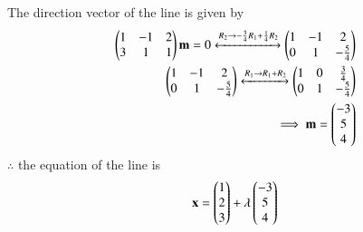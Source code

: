 The direction vector of the line  is given by 
\begin{align*}
 \begin{pmatrix}1&-1&2 \\ 3&1&1\end{pmatrix}\mathbf{m} = 0
 \xleftrightarrow[]{R_2\rightarrow -\frac{3}{4}{R_1} + \frac{1}{4}{R_2}} \begin{pmatrix}1&-1&2 \\ 0&1&-\frac{5}{4}\end{pmatrix}\\
   \begin{pmatrix}1&-1&2 \\ 0&1&-\frac{5}{4}\end{pmatrix} \xleftrightarrow[]{R_1\rightarrow {R_1} + {R_2}} \begin{pmatrix}1&0&\frac{3}{4} \\ 0&1&-\frac{5}{4}\end{pmatrix}
   \\
 \implies \mathbf{m} =\begin{pmatrix}-3\\5\\4\end{pmatrix}
\end{align*}
$\therefore$ the equation of the line is
\begin{align}
    \mathbf{x} = \begin{pmatrix}1\\2\\3\end{pmatrix} + \lambda\begin{pmatrix}-3\\5\\4\end{pmatrix} 
\end{align}

